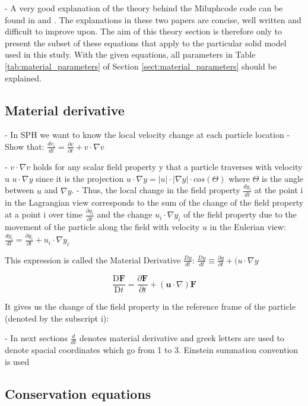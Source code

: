 - A very good explanation of the theory behind the Miluphcode code can be found in \cite{Schaefer_2016} and \cite{Schaefer_2020}. The explanations in these two papers are concise, well written and difficult to improve upon. The aim of this theory section is therefore only to present the subset of these equations that apply to the particular solid model used in this study. With the given equations, all parameters in Table \ref{tab:material_parameters} of Section \ref{sect:material_parameters} should be explained.

\subsection{Material derivative}
- In SPH we want to know the local velocity change at each particle location
- Show that:
$ \frac{dv_i}{dt} = \frac{\partial v}{\partial t} + v \cdot \nabla v $

- $v \cdot \nabla v $ holds for any scalar field property y that a particle traverses with velocity u $u \cdot \nabla y $ since it is the projection $u \cdot \nabla y = |u|\cdot|\nabla y| \cdot cos (\Theta)$ where $\Theta$ is the angle between $u$ and $\nabla y$.
- Thus, the local change in the field property $\frac{dy_i}{dt}$ at the point i in the Lagrangian view corresponds to the sum of the change of the field property at a point i over time $\frac{\partial y_i}{\partial t}$ and the change $u_i \cdot \nabla y_i $ of the field property due to the movement of the particle along the field with velocity $u$ in the Eulerian view:
$ \frac{dy_i}{dt} = \frac{\partial y_i}{\partial t} + u_i \cdot \nabla y_i $

This expression is called the Material Derivative $\frac{Dy}{dt}$:
$ \frac{Dy}{dt} \equiv \frac{\partial y}{\partial t} + (u \cdot \nabla y $

\begin{equation}
    {\frac {\mathrm {D} \mathbf {F} }{\mathrm {D} t}}={\frac {\partial \mathbf {F} }{\partial t}}+\left(\mathbf {u} \cdot \nabla \right)\mathbf {F}
\end{equation}

It gives us the change of the field property in the reference frame of the particle (denoted by the subscript i):

- In next sections $\frac{d}{dt}$ denotes material derivative and greek letters are used to denote spacial coordinates which go from 1 to 3. Einstein summation convention is used
\subsection{Conservation equations}


